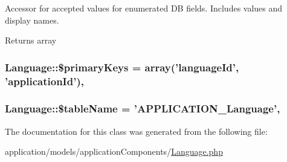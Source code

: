 Accessor for accepted values for enumerated D\-B fields. Includes values and display names.

\begin{DoxyReturn}{Returns}
array 
\end{DoxyReturn}
\hypertarget{class_language_a768248776c14afa80f871a74895509e9}{
\subsubsection[{\$primary\-Keys}]{\setlength{\rightskip}{0pt plus 5cm}Language\-::\$primary\-Keys = array('language\-Id', 'application\-Id')\hspace{0.3cm}{\ttfamily [static]}, {\ttfamily [protected]}}}\label{class_language_a768248776c14afa80f871a74895509e9}
\hypertarget{class_language_ab780211c5244ec4eb99b642d141b6ea9}{
\subsubsection[{\$table\-Name}]{\setlength{\rightskip}{0pt plus 5cm}Language\-::\$table\-Name = 'A\-P\-P\-L\-I\-C\-A\-T\-I\-O\-N\-\_\-\-Language'\hspace{0.3cm}{\ttfamily [static]}, {\ttfamily [protected]}}}\label{class_language_ab780211c5244ec4eb99b642d141b6ea9}


The documentation for this class was generated from the following file\-:\begin{DoxyCompactItemize}
\item 
application/models/application\-Components/\hyperlink{_language_8php}{Language.\-php}\end{DoxyCompactItemize}
